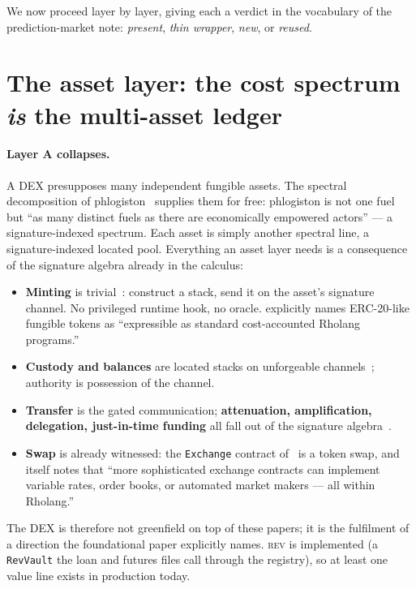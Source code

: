 \documentclass[11pt]{article}
\theoremstyle{definition}
\newcommand{\rev}{\textsc{rev}}
\begin{document}
We now proceed layer by layer, giving each a verdict in the vocabulary of the prediction-market
note: \emph{present}, \emph{thin wrapper}, \emph{new}, or \emph{reused}.

\section{The asset layer: the cost spectrum \emph{is} the multi-asset ledger}\label{sec:assets}

\paragraph{Layer A collapses.}
A DEX presupposes many independent fungible assets. The spectral decomposition of
phlogiston~\cite[\S5.6]{cost} supplies them for free: phlogiston is not one fuel but ``as many
distinct fuels as there are economically empowered actors'' --- a signature-indexed spectrum. Each
asset is simply another spectral line, a signature-indexed located pool. Everything an asset layer
needs is a consequence of the signature algebra already in the calculus:

\begin{itemize}[leftmargin=1.4em]
\item \textbf{Minting} is trivial~\cite[\S2.4]{cost}: construct a stack, send it on the asset's
signature channel. No privileged runtime hook, no oracle. \cite{cost} explicitly names ERC-20-like
fungible tokens as ``expressible as standard cost-accounted Rholang programs.''
\item \textbf{Custody and balances} are located stacks on unforgeable channels~\cite[\S3.2]{finrho};
authority is possession of the channel.
\item \textbf{Transfer} is the gated communication; \textbf{attenuation, amplification, delegation,
just-in-time funding} all fall out of the signature algebra~\cite[\S2.4]{cost}.
\item \textbf{Swap} is already witnessed: the \texttt{Exchange} contract of~\cite[App.\,B.9]{cost} is
a token swap, and \cite{cost} itself notes that ``more sophisticated exchange contracts can implement
variable rates, order books, or automated market makers --- all within Rholang.''
\end{itemize}

\noindent
The DEX is therefore not greenfield on top of these papers; it is the fulfilment of a direction the
foundational paper explicitly names. \rev{} is implemented (a \texttt{RevVault} the loan and futures
files call through the registry), so at least one value line exists in production today.
\end{document}

